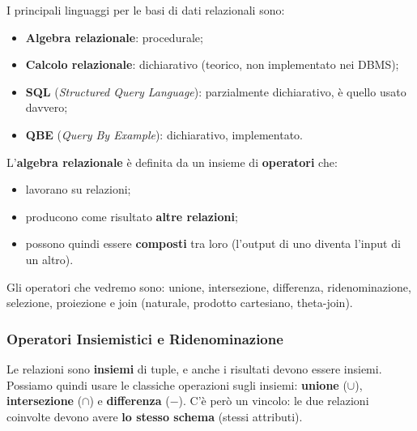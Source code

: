 \documentclass[12pt]{extarticle}
\begin{document}
\noindent I principali linguaggi per le basi di dati relazionali sono:
\begin{itemize}
    \item \textbf{Algebra relazionale}: procedurale;
    \item \textbf{Calcolo relazionale}: dichiarativo (teorico, non implementato nei DBMS);
    \item \textbf{SQL} (\textit{Structured Query Language}): parzialmente dichiarativo, è quello usato davvero;
    \item \textbf{QBE} (\textit{Query By Example}): dichiarativo, implementato.
\end{itemize}

\medskip
\noindent L'\textbf{algebra relazionale} è definita da un insieme di \textbf{operatori} che:
\begin{itemize}
    \item lavorano su relazioni;
    \item producono come risultato \textbf{altre relazioni};
    \item possono quindi essere \textbf{composti} tra loro (l'output di uno diventa l'input di un altro).
\end{itemize}
Gli operatori che vedremo sono: unione, intersezione, differenza, ridenominazione, selezione, proiezione e join (naturale, prodotto cartesiano, theta-join).

\subsubsection{Operatori Insiemistici e Ridenominazione}
\noindent Le relazioni sono \textbf{insiemi} di tuple, e anche i risultati devono essere insiemi. Possiamo quindi usare le classiche operazioni sugli insiemi: \textbf{unione} ($\cup$), \textbf{intersezione} ($\cap$) e \textbf{differenza} ($-$). C'è però un vincolo: le due relazioni coinvolte devono avere \textbf{lo stesso schema} (stessi attributi).
\end{document}
